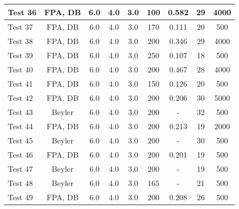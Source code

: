\begin{table}[!h]
\begin{center}
\begin{tabular}{|l|c|c|c|c|c|c|c|c|}
Test 36    &  FPA, DB           &  6.0       &  4.0       &  3.0       &  100            &  0.582          &  29                &  4000            \\ \hline
Test 37    &  FPA, DB           &  6.0       &  4.0       &  3.0       &  170            &  0.111          &  20                &  500             \\ \hline
Test 38    &  FPA, DB           &  6.0       &  4.0       &  3.0       &  200            &  0.346          &  29                &  4000            \\ \hline
Test 39    &  FPA, DB           &  6.0       &  4.0       &  3.0       &  250            &  0.107          &  18                &  500             \\ \hline
Test 40    &  FPA, DB           &  6.0       &  4.0       &  3.0       &  200            &  0.467          &  28                &  4000            \\ \hline
Test 41    &  FPA, DB           &  6.0       &  4.0       &  3.0       &  150            &  0.126          &  20                &  500             \\ \hline
Test 42    &  FPA, DB           &  6.0       &  4.0       &  3.0       &  200            &  0.206          &  30                &  5000            \\ \hline
Test 43    &  Beyler            &  6.0       &  4.0       &  3.0       &  200            &  -              &  32                &  500             \\ \hline
Test 44    &  FPA, DB           &  6.0       &  4.0       &  3.0       &  200            &  0.213          &  19                &  2000            \\ \hline
Test 45    &  Beyler            &  6.0       &  4.0       &  3.0       &  200            &  -              &  30                &  500             \\ \hline
Test 46    &  FPA, DB           &  6.0       &  4.0       &  3.0       &  200            &  0.201          &  19                &  500             \\ \hline
Test 47    &  Beyler            &  6.0       &  4.0       &  3.0       &  200            &  -              &  19                &  500             \\ \hline
Test 48    &  Beyler            &  6.0       &  4.0       &  3.0       &  165            &  -              &  21                &  500             \\ \hline
Test 49    &  FPA, DB           &  6.0       &  4.0       &  3.0       &  200            &  0.208          &  26                &  500             \\ \hline

\end{tabular}
\end{center}
\end{table}
